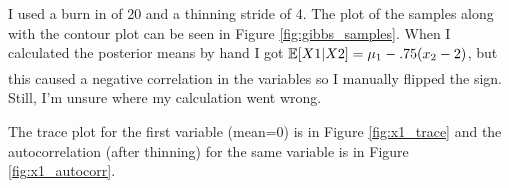 \section{}

I used a burn in of 20 and a thinning stride of 4.
The plot of the samples along with the contour plot can be seen in Figure \ref{fig:gibbs_samples}.
When I calculated the posterior means by hand I got $\underset{\scriptscriptstyle{}}{\mathbb{E}}[X1|X2] = \mu_1 - .75(x_2 - 2)$, but this caused a negative correlation in the variables so I manually flipped the sign.
Still, I'm unsure where my calculation went wrong.

The trace plot for the first variable (mean=0) is in Figure \ref{fig:x1_trace} and the autocorrelation (after thinning) for the same variable is in Figure \ref{fig:x1_autocorr}.



